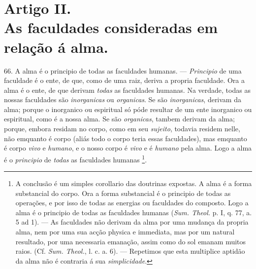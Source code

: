 
\section*{Artigo II.\\ As faculdades consideradas em relação á alma.}

    66. A alma é o principio de todas as faculdades humanas. --- \emph{Principio} de uma faculdade é o ente, de que, como de uma raiz, deriva a propria faculdade. Ora a alma é o ente, de que derivam \emph{todas} as faculdades humanas. Na verdade, todas as nossas faculdades são \emph{inorganicas} ou \emph{organicas}. Se são \emph{inorganicas}, derivam da alma; porque o inorganico ou espiritual só póde resultar de um ente inorganico ou espiritual, como é a nossa alma. Se são \emph{organicas}, tambem derivam da alma; porque, embora residam no corpo, como em seu \emph{sujeito}, todavia residem nelle, não emquanto é corpo (aliás todo o corpo teria essas faculdades), mas emquanto é corpo \emph{vivo} e \emph{humano}, e o nosso corpo é \emph{vivo} e é \emph{humano} pela alma. Logo a alma é o \emph{principio} de \emph{todas} as faculdades humanas \footnote{A conclusão é um simples corollario das doutrinas expostas. A alma é a forma substancial do corpo. Ora a forma substancial é o principio de todas as operações, e por isso de todas as energias ou faculdades do composto. Logo a alma é o principio de todas as faculdades humanas (\emph{Sum. Theol.} p. I, q. 77, a. 5 ad 1). --- As faculdades não derivam da alma por uma mudança da propria alma, nem por uma sua acção physica e immediata, mas por um natural resultado, por uma necessaria emanação, assim como do sol emanam muitos raios. (Cf. \emph{Sum. Theol.}, l. c. a. 6). --- Repetimos que esta multiplice aptidão da alma não é contraria á sua \emph{simplicidade}.}.

